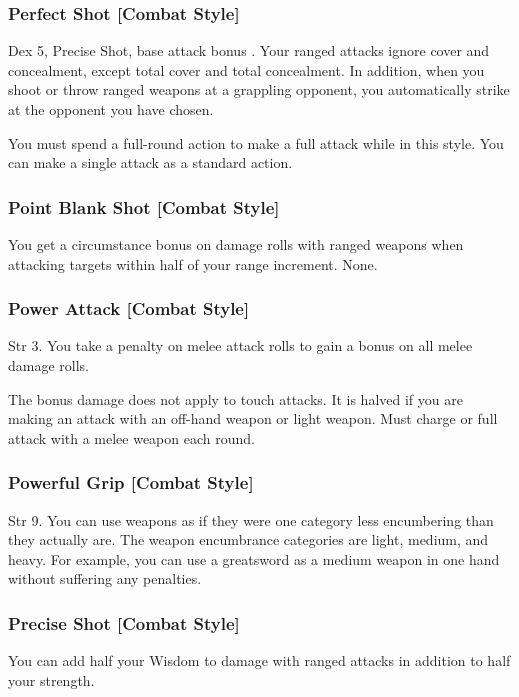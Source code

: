 \subsubsection{Perfect Shot [Combat Style]}
 Dex 5, Precise Shot, base attack bonus .
 Your ranged attacks ignore cover and concealment, except total cover and total concealment. In addition, when you shoot or throw ranged weapons at a grappling opponent, you automatically strike at the opponent you have chosen.

You must spend a full-round action to make a full attack while in this style. You can make a single attack as a standard action.

\subsubsection{Point Blank Shot [Combat Style]}
 You get a  circumstance bonus on damage rolls with ranged weapons when attacking targets within half of your range increment. \babscalingdescription
{} None.

\subsubsection{Power Attack [Combat Style]}
 Str 3.
 You take a  penalty on melee attack rolls to gain a  bonus on all melee damage rolls. \babscalingdescription 
\par The bonus damage does not apply to touch attacks. It is halved if you are making an attack with an off-hand weapon or light weapon.
 Must charge or full attack with a melee weapon each round.

\subsubsection{Powerful Grip [Combat Style]}
 Str 9.
 You can use weapons as if they were one category less encumbering than they actually are. The weapon encumbrance categories are light, medium, and heavy. For example, you can use a greatsword as a medium weapon in one hand without suffering any penalties.

\subsubsection{Precise Shot [Combat Style]}
 You can add half your Wisdom to damage with ranged attacks in addition to half your strength.

